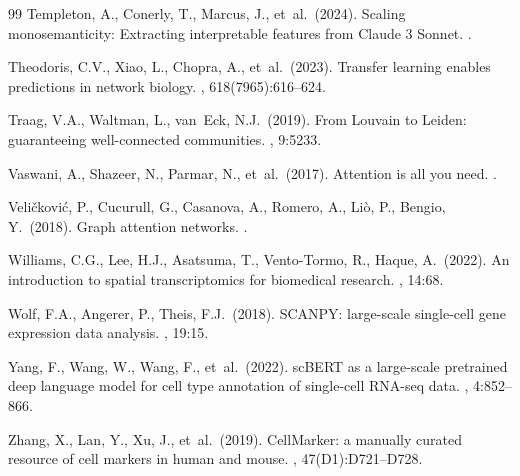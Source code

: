 \documentclass[11pt]{article}
\begin{document}
\begin{thebibliography}{99}
Templeton, A., Conerly, T., Marcus, J., et~al.\ (2024).
\newblock Scaling monosemanticity: Extracting interpretable features
  from Claude 3 Sonnet.
.

Theodoris, C.V., Xiao, L., Chopra, A., et~al.\ (2023).
\newblock Transfer learning enables predictions in network biology.
, 618(7965):616--624.

Traag, V.A., Waltman, L., van~Eck, N.J.\ (2019).
\newblock From Louvain to Leiden: guaranteeing well-connected communities.
, 9:5233.

Vaswani, A., Shazeer, N., Parmar, N., et~al.\ (2017).
\newblock Attention is all you need.
.

Veli\v{c}kovi\'{c}, P., Cucurull, G., Casanova, A., Romero, A.,
Li\`{o}, P., Bengio, Y.\ (2018).
\newblock Graph attention networks.
.


Williams, C.G., Lee, H.J., Asatsuma, T., Vento-Tormo, R., Haque, A.\ (2022).
\newblock An introduction to spatial transcriptomics for biomedical research.
, 14:68.

Wolf, F.A., Angerer, P., Theis, F.J.\ (2018).
\newblock SCANPY: large-scale single-cell gene expression data analysis.
, 19:15.

Yang, F., Wang, W., Wang, F., et~al.\ (2022).
\newblock scBERT as a large-scale pretrained deep language model for cell
  type annotation of single-cell RNA-seq data.
, 4:852--866.

Zhang, X., Lan, Y., Xu, J., et~al.\ (2019).
\newblock CellMarker: a manually curated resource of cell markers in
  human and mouse.
, 47(D1):D721--D728.


\end{thebibliography}
\end{document}
